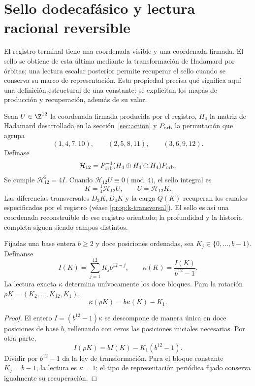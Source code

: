 \section{Sello dodecafásico y lectura racional reversible}
\label{sec:sello}

El registro terminal tiene una coordenada visible y una coordenada
firmada. El sello se obtiene de esta última mediante la transformación
de Hadamard por órbitas; una lectura escalar posterior permite recuperar
el sello cuando se conserva su marco de representación. Esta propiedad
precisa qué significa aquí una definición estructural de una constante:
se explicitan los mapas de producción y recuperación, además de su valor.

Sean $U\in\Z^{12}$ la coordenada firmada producida por el registro,
$H_4$ la matriz de Hadamard desarrollada en la sección~\ref{sec:action}
y $P_{\rm orb}$ la permutación que agrupa
\[
 (1,4,7,10),\qquad(2,5,8,11),\qquad(3,6,9,12).
\]
Defínase
\[
 \mathcal H_{12}=P_{\rm orb}^{-1}
 (H_4\oplus H_4\oplus H_4)P_{\rm orb}.
\]
Se cumple $\mathcal H_{12}^2=4I$. Cuando
$\mathcal H_{12}U\equiv0\pmod4$, el sello integral es
\[
 K=\tfrac14\mathcal H_{12}U,
 \qquad U=\mathcal H_{12}K.
\]
Las diferencias transversales $D_3K,D_4K$ y la carga $Q(K)$ recuperan
los canales especificados por el registro (véase \ref{prop:k-transversal}).
El sello es así una coordenada reconstruible de ese registro orientado;
la profundidad y la historia completa siguen siendo campos distintos.

\begin{proposition}
Fijadas una base entera $b\ge2$ y doce posiciones ordenadas, sea
$K_j\in\{0,\ldots,b-1\}$. Defínanse
\[
 I(K)=\sum_{j=1}^{12}K_jb^{12-j},\qquad
 \kappa(K)=\frac{I(K)}{b^{12}-1}.
\]
La lectura exacta $\kappa$ determina unívocamente los doce bloques.
Para la rotación $\rho K=(K_2,\ldots,K_{12},K_1)$,
\[
 \boxed{\kappa(\rho K)=b\kappa(K)-K_1.}
\]
\end{proposition}
\begin{proof}
El entero $I=(b^{12}-1)\kappa$ se descompone de manera única en doce
posiciones de base $b$, rellenando con ceros las posiciones iniciales
necesarias. Por otra parte,
\[
 I(\rho K)=bI(K)-K_1(b^{12}-1).
\]
Dividir por $b^{12}-1$ da la ley de transformación. Para el bloque
constante $K_j=b-1$, la lectura es $\kappa=1$; el tipo de representación
periódica fijado conserva igualmente su recuperación.
\end{proof}

